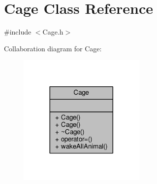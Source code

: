 \hypertarget{classCage}{}\section{Cage Class Reference}
\label{classCage}


{\ttfamily \#include $<$Cage.\+h$>$}



Collaboration diagram for Cage\+:
\nopagebreak
\begin{figure}[H]
\begin{center}
\leavevmode
\includegraphics[width=176pt]{classCage__coll__graph}
\end{center}
\end{figure}
